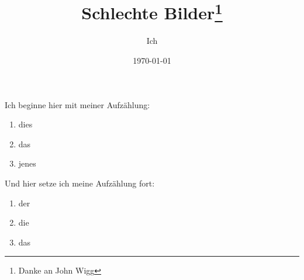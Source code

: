 \documentclass[a4paper, 10pt,onecolumn, captions=tableheading]{scrartcl}
\title{Schlechte Bilder\thanks{Danke an John Wigg}}
\author{Ich} %
\date{\today}
\begin{document}
Ich beginne hier mit meiner Aufzählung:
\begin{enumerate}
	\item dies
	\item das
	\item jenes
	\setcounter{enum}{\value{enumi}}
\end{enumerate}
Und hier setze ich meine Aufzählung fort:
\begin{enumerate}
	\setcounter{enumi}{\value{enum}}
	\item der
	\item die
	\item das
\end{enumerate}


	
\end{document}
